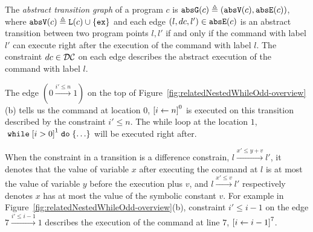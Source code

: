 
\begin{defn}
 \label{def:abs_cfg}
 The \emph{abstract transition graph} of a program $c$ is $\mathtt{abs}{\mathtt{G}}(c) \triangleq (\mathtt{abs}{\mathtt{V}}(c), \mathtt{abs}{\mathtt{E}}(c))$, where
 $\mathtt{abs}{\mathtt{V}}(c) \triangleq \mathtt{L}(c)\cup\{\mathtt{ex}\}$
 and 
 each edge $(l, dc, l') \in \mathtt{abs}{\mathtt{E}}(c)$ is an abstract transition
between two program points $l, l'$ if and only if
the command with label $l'$ can execute right after the execution of the command with label $l$.
The constraint $dc \in \mathcal{DC}$ on each edge
describes the abstract execution of the command with label $l$.
\end{defn}
The edge $(0 \xrightarrow{i' \leq n} 1)$ on the top of Figure~\ref{fig:relatedNestedWhileOdd-overview}(b) tells us the command at location $0$,
$\clabel{\assign{i}{n}}^0$ is executed on this transition described by the constraint $i' \leq n$. The while loop at the location $1$, $\ewhile \clabel{i > 0}^1 \edo \{\ldots\}$ will be executed right after.


When the constraint in a transition is a difference constrain, $l \xrightarrow{x' \leq y + v} l'$,
it denotes that
the value of variable $x$
after executing the command at $l$ is at most
the value of variable $y$ before the execution plus $v$,
and $l \xrightarrow{x' \leq v} l'$ respectively denotes
$x$ has at most
the value of the symbolic constant $v$.
For example in Figure~\ref{fig:relatedNestedWhileOdd-overview}(b), constraint $i' \leq i - 1$ on the edge $7 \xrightarrow{i' \leq i - 1} 1$
describes the execution of
 the command at line $7$, 
$\clabel{\assign{i}{i - 1}}^{7}$. 

